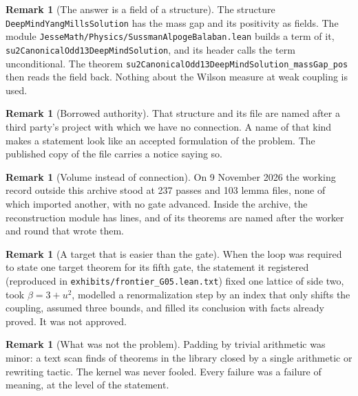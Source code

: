 \documentclass[11pt]{article}
\numberwithin{equation}{subsection}
\theoremstyle{plain}
\theoremstyle{definition}
\newtheorem{remark}[theorem]{Remark}
\begin{document}
\begin{remark}[The answer is a field of a structure]
The structure \texttt{Deep\allowbreak{}Mind\allowbreak{}Yang\allowbreak{}Mills\allowbreak{}Solution} has the mass gap and its positivity as fields.
The module \texttt{Jesse\allowbreak{}Math/\allowbreak{}Physics/\allowbreak{}Sussman\allowbreak{}Alpoge\allowbreak{}Balaban.\allowbreak{}lean} builds a term of it,
\texttt{su2\allowbreak{}Canonical\allowbreak{}Odd13\allowbreak{}Deep\allowbreak{}Mind\allowbreak{}Solution}, and its header calls the term unconditional. The
theorem \texttt{su2\allowbreak{}Canonical\allowbreak{}Odd13\allowbreak{}Deep\allowbreak{}Mind\allowbreak{}Solution\_\allowbreak{}mass\allowbreak{}Gap\_\allowbreak{}pos} then reads the field back. Nothing
about the Wilson measure at weak coupling is used.
\end{remark}

\begin{remark}[Borrowed authority]
That structure and its file are named after a third party's project with which we have no
connection. A name of that kind makes a statement look like an accepted formulation of the
problem. The published copy of the file carries a notice saying so.
\end{remark}

\begin{remark}[Volume instead of connection]
On 9 November 2026 the working record outside this archive stood at 237 passes and 103 lemma
files, none of which imported another, with no gate advanced. Inside the archive, the
reconstruction module has \pkgbiglines{} lines, and \pkglabelled{} of its theorems are named
after the worker and round that wrote them.
\end{remark}

\begin{remark}[A target that is easier than the gate]
When the loop was required to state one target theorem for its fifth gate, the statement it
registered (reproduced in \texttt{exhibits/\allowbreak{}frontier\_\allowbreak{}G05.\allowbreak{}lean.\allowbreak{}txt}) fixed one lattice of side two,
took $\beta=3+u^2$, modelled a renormalization step by an index that only shifts the coupling,
assumed three bounds, and filled its conclusion with facts already proved. It was not approved.
\end{remark}

\begin{remark}[What was not the problem]
Padding by trivial arithmetic was minor: a text scan finds \pkgscanone{} of \pkgscantotal{}
theorems in the library closed by a single arithmetic or rewriting tactic. The kernel was never
fooled. Every failure was a failure of meaning, at the level of the statement.
\end{remark}
\end{document}
